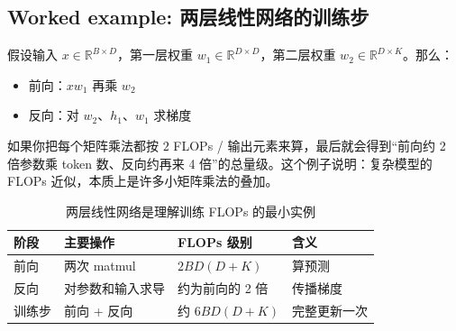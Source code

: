\subsection{Worked example: 两层线性网络的训练步}

假设输入 \(x\in\mathbb{R}^{B\times D}\)，第一层权重 \(w_1\in\mathbb{R}^{D\times D}\)，第二层权重 \(w_2\in\mathbb{R}^{D\times K}\)。那么：
\begin{itemize}
    \item 前向：\(xw_1\) 再乘 \(w_2\)
    \item 反向：对 \(w_2\)、\(h_1\)、\(w_1\) 求梯度
\end{itemize}

如果你把每个矩阵乘法都按 \(2\) FLOPs / 输出元素来算，最后就会得到“前向约 2 倍参数乘 token 数、反向约再来 4 倍”的总量级。这个例子说明：复杂模型的 FLOPs 近似，本质上是许多小矩阵乘法的叠加。

\begin{table}[H]
\centering
\begin{tabular}{p{}p{}p{}p{}}
\toprule
\textbf{阶段} & \textbf{主要操作} & \textbf{FLOPs 级别} & \textbf{含义} \\
\midrule
前向 & 两次 matmul & \(2BD(D+K)\) & 算预测 \\
反向 & 对参数和输入求导 & 约为前向的 2 倍 & 传播梯度 \\
训练步 & 前向 + 反向 & 约 \(6BD(D+K)\) & 完整更新一次 \\
\bottomrule
\end{tabular}
\caption{两层线性网络是理解训练 FLOPs 的最小实例}
\end{table}

